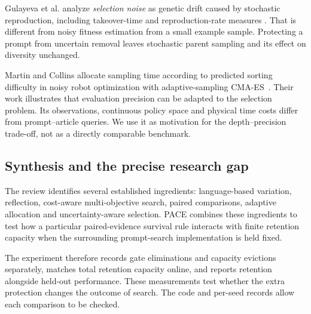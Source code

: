 Gulayeva et al. analyze \emph{selection noise} as genetic drift caused by stochastic
reproduction, including takeover-time and reproduction-rate measures
\cite{selectionnoise}. That is different from noisy fitness estimation from a
small example sample. Protecting a prompt from uncertain removal leaves stochastic parent sampling
and its effect on diversity unchanged.

Martin and Collins allocate sampling time according to predicted sorting
difficulty in noisy robot optimization with adaptive-sampling
CMA-ES~\cite{robotnoise}. Their work illustrates that evaluation precision can be
adapted to the selection problem. Its observations, continuous policy space and
physical time costs differ from prompt--article queries. We use it as motivation
for the depth--precision trade-off, not as a directly comparable benchmark.

\subsection{Synthesis and the precise research gap}
The review identifies several established ingredients: language-based variation,
reflection, cost-aware multi-objective search, paired comparisons, adaptive
allocation and uncertainty-aware selection. PACE combines these ingredients
to test how a
particular paired-evidence survival rule interacts with finite retention capacity
when the surrounding prompt-search implementation is held fixed.

The experiment therefore records gate eliminations and capacity evictions
separately, matches total retention capacity online, and reports retention
alongside held-out performance. These measurements test whether the extra
protection changes the outcome of search. The code and per-seed records allow
each comparison to be checked.

